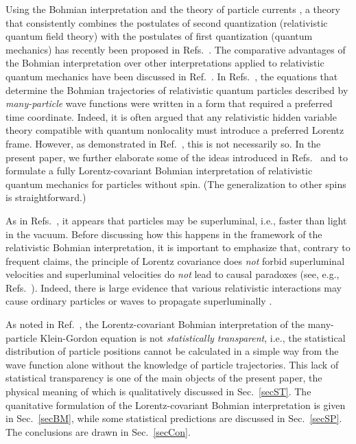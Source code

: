 \documentclass[11pt]{article}
\begin{document}
Using the Bohmian interpretation 
\cite{bohm,bohmPR1,bohmPR2,holPR,holbook} and the theory of 
particle currents \cite{nikcur1,nikcur2,nikcur3},
a theory that consistently combines 
the postulates of second quantization 
(relativistic quantum field theory) with the postulates of 
first quantization 
(quantum mechanics) has recently been proposed in 
Refs.~\cite{nikoldbb1,nikoldbb2}. The comparative advantages of the Bohmian 
interpretation over other interpretations applied to relativistic 
quantum mechanics have been discussed in Ref.~\cite{nikoldbb3}.
In Refs.~\cite{nikoldbb1,nikoldbb2}, the equations that determine 
the Bohmian trajectories of relativistic quantum particles
described by {\em many-particle} wave functions
were written in a form that required a preferred time 
coordinate. Indeed, it is often argued that any relativistic 
hidden variable theory compatible with quantum nonlocality 
must introduce a preferred Lorentz frame. However, as 
demonstrated in Ref.~\cite{bern}, this is not necessarily so.
In the present paper, we further elaborate some of the ideas introduced 
in Refs.~\cite{nikoldbb1} and \cite{bern}
to formulate a fully Lorentz-covariant Bohmian interpretation of 
relativistic quantum mechanics for particles without spin. 
(The generalization to other spins is straightforward.)


As in Refs.~\cite{bern,nikoldbb1}, it appears that particles may 
be superluminal, i.e., faster than light in the vacuum.
Before discussing how this happens in the framework of the relativistic 
Bohmian interpretation, it is important to emphasize that, 
contrary to frequent claims, the principle of Lorentz covariance
does {\em not} forbid superluminal velocities and superluminal 
velocities do {\em not} lead to 
causal paradoxes (see, e.g., Refs.~\cite{lib,nikolcaus}). Indeed, there is  
large evidence that various relativistic interactions 
may cause ordinary particles or waves to propagate superluminally
\cite{gar,chu,drum,sch,chi,bol,chi2,nik}.

As noted in Ref.~\cite{bern}, the Lorentz-covariant Bohmian interpretation 
of the many-particle Klein-Gordon equation is not 
{\em statistically transparent}, i.e., the statistical distribution
of particle positions cannot be calculated in a simple way 
from the wave function alone without the knowledge of  
particle trajectories. This lack of statistical transparency 
is one of the main objects of the present paper, the physical 
meaning of which is qualitatively discussed in Sec.~\ref{secST}.
The quanitative formulation of the Lorentz-covariant Bohmian interpretation
is given in Sec.~\ref{secBM}, while some statistical predictions 
are discussed in Sec.~\ref{secSP}.
The conclusions are drawn in Sec.~\ref{secCon}. 
\end{document}
